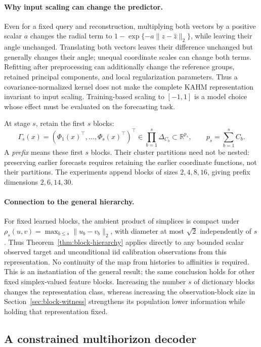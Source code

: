 \paragraph{Why input scaling can change the predictor.}
Even for a fixed query and reconstruction, multiplying both vectors by a
positive scalar $a$ changes the radial term to
$1-\exp\{-a\|z-\widehat z\|_2\}$, while leaving their angle unchanged.
Translating both vectors leaves their difference unchanged but generally
changes their angle; unequal coordinate scales can change both terms.
Refitting after preprocessing can additionally change the reference groups,
retained principal components, and local regularization parameters. Thus a
covariance-normalized kernel does not make the complete KAHM representation
invariant to input scaling. Training-based scaling to $[-1,1]$ is a
model choice whose effect must be evaluated on the forecasting task.

At stage $s$, retain the first $s$ blocks:
\[
 \Gamma_s(x)=(\Phi_1(x)^\top,\ldots,\Phi_s(x)^\top)^\top
 \in\prod_{b=1}^s\Delta_{C_b}\subset\mathbb R^{p_s},
 \qquad p_s=\sum_{b=1}^s C_b.
\]
A \emph{prefix} means these first $s$ blocks. Their cluster partitions need
not be nested: preserving earlier forecasts requires retaining the earlier
coordinate functions, not their partitions. The experiments append blocks of
sizes $2,4,8,16$, giving prefix dimensions $2,6,14,30$.


\paragraph{Connection to the general hierarchy.}
For fixed learned blocks, the ambient product of simplices is compact under
$\rho_s(u,v)=\max_{b\leq s}\|u_b-v_b\|_2$, with diameter at most
$\sqrt2$ independently of $s$. Thus Theorem~\ref{thm:block-hierarchy}
applies directly to any bounded scalar observed target and unconditional iid
calibration observations from this representation. No continuity of the map
from histories to affinities is required. This is an instantiation of the
general result; the same conclusion holds for other fixed simplex-valued
feature blocks. Increasing the number $s$ of dictionary blocks changes the
representation class, whereas increasing the observation-block size in
Section~\ref{sec:block-witness} strengthens its population lower information
while holding that representation fixed.

\subsection{A constrained multihorizon decoder}


